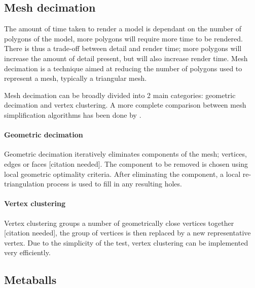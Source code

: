 
\subsection{Mesh decimation}
\label{sub:background_decimation}

The amount of time taken to render a model is dependant on the number of
polygons of the model, more polygons will require more time to be rendered.
There is thus a trade-off between detail and render time; more polygons will
increase the amount of detail present, but will also increase render time.
Mesh decimation is a technique aimed at reducing the number of polygons used to
represent a mesh, typically a triangular mesh.

Mesh decimation can be broadly divided into 2 main categories: geometric
decimation and vertex clustering. A more complete comparison between mesh
simplification algorithms has been done by \citet{cignoni98}.

\paragraph{Geometric decimation}

Geometric decimation iteratively eliminates components of the mesh; vertices,
edges or faces [citation needed]. The component to be removed is chosen using
local geometric optimality criteria. After eliminating the component, a local
re-triangulation process is used to fill in any resulting holes.


\paragraph{Vertex clustering}


Vertex clustering groups a number of geometrically close vertices together
[citation needed], the group of vertices is then replaced by a new
representative vertex.  Due to the simplicity of the test, vertex clustering
can be implemented very efficiently.



\subsection{Metaballs}
\label{sub:background_metaballs}

